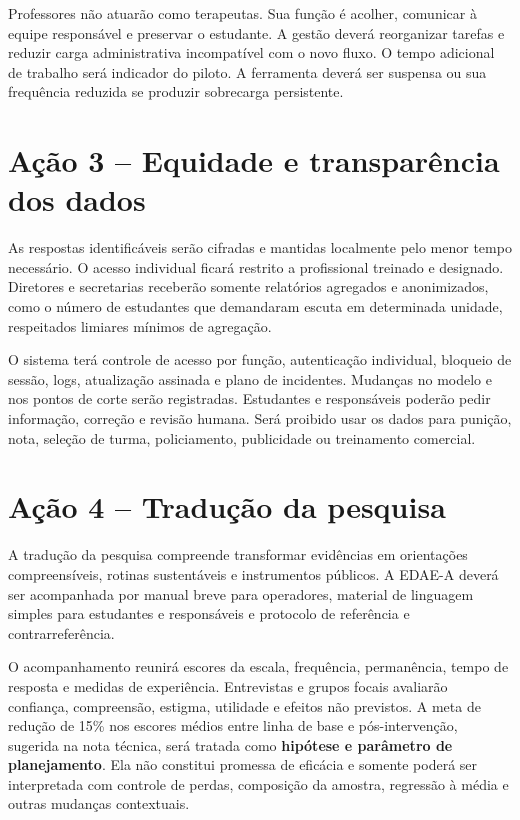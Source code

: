 \documentclass[
  12pt,
  openright,
  oneside,
  a4paper,
  english,
  brazil
]{abntex2}
\begin{document}
Professores não atuarão como terapeutas. Sua função é acolher, comunicar à equipe
responsável e preservar o estudante. A gestão deverá reorganizar tarefas e
reduzir carga administrativa incompatível com o novo fluxo. O tempo adicional de
trabalho será indicador do piloto. A ferramenta deverá ser suspensa ou sua
frequência reduzida se produzir sobrecarga persistente.

\section{Ação 3 -- Equidade e transparência dos dados}

As respostas identificáveis serão cifradas e mantidas localmente pelo menor
tempo necessário. O acesso individual ficará restrito a profissional treinado e
designado. Diretores e secretarias receberão somente relatórios agregados e
anonimizados, como o número de estudantes que demandaram escuta em determinada
unidade, respeitados limiares mínimos de agregação.

O sistema terá controle de acesso por função, autenticação individual, bloqueio
de sessão, logs, atualização assinada e plano de incidentes. Mudanças no modelo e
nos pontos de corte serão registradas. Estudantes e responsáveis poderão pedir
informação, correção e revisão humana. Será proibido usar os dados para punição,
nota, seleção de turma, policiamento, publicidade ou treinamento comercial.

\section{Ação 4 -- Tradução da pesquisa}

A tradução da pesquisa compreende transformar evidências em orientações
compreensíveis, rotinas sustentáveis e instrumentos públicos. A EDAE-A deverá
ser acompanhada por manual breve para operadores, material de linguagem simples
para estudantes e responsáveis e protocolo de referência e contrarreferência.

O acompanhamento reunirá escores da escala, frequência, permanência, tempo de
resposta e medidas de experiência. Entrevistas e grupos focais avaliarão
confiança, compreensão, estigma, utilidade e efeitos não previstos. A meta de
redução de 15\% nos escores médios entre linha de base e pós-intervenção,
sugerida na nota técnica, será tratada como \textbf{hipótese e parâmetro de
planejamento}. Ela não constitui promessa de eficácia e somente poderá ser
interpretada com controle de perdas, composição da amostra, regressão à média e
outras mudanças contextuais.
\end{document}
